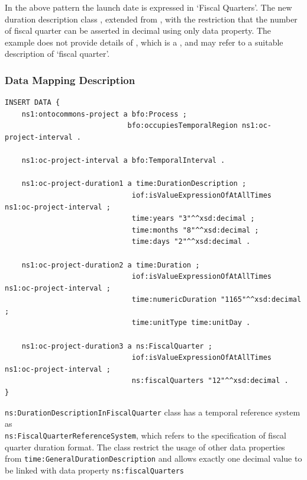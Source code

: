 In the above pattern the launch date is expressed in `Fiscal Quarters'. The new duration description class , extended from , with the restriction that the number of fiscal quarter can be asserted in decimal using only  data property. The example does not provide details of , which is a , and may refer to a suitable description of `fiscal quarter'. 


\subsubsection*{Data Mapping Description}

\begin{verbatim}
INSERT DATA {
    ns1:ontocommons-project a bfo:Process ;
                             bfo:occupiesTemporalRegion ns1:oc-project-interval .

    ns1:oc-project-interval a bfo:TemporalInterval .

    ns1:oc-project-duration1 a time:DurationDescription ;
                              iof:isValueExpressionOfAtAllTimes ns1:oc-project-interval ;
                              time:years "3"^^xsd:decimal ;
                              time:months "8"^^xsd:decimal ;
                              time:days "2"^^xsd:decimal .

    ns1:oc-project-duration2 a time:Duration ;
                              iof:isValueExpressionOfAtAllTimes ns1:oc-project-interval ;
                              time:numericDuration "1165"^^xsd:decimal ;
                              time:unitType time:unitDay .

    ns1:oc-project-duration3 a ns:FiscalQuarter ;
                              iof:isValueExpressionOfAtAllTimes ns1:oc-project-interval ;
                              ns:fiscalQuarters "12"^^xsd:decimal .
}
\end{verbatim}

\texttt{ns:DurationDescriptionInFiscalQuarter} class has a temporal reference system as \\ \texttt{ns:FiscalQuarterReferenceSystem}, which refers to the specification of fiscal quarter duration format. The class restrict the usage of other data properties from \texttt{time:GeneralDurationDescription} and allows exactly one decimal value to be linked with data property \texttt{ns:fiscalQuarters}

